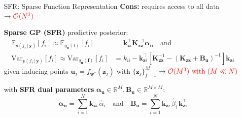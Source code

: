 \documentclass[final,12pt]{beamer}
\newcommand{\mathbold}[1]{\bm{#1}}
\newcommand{\mbf}[1]{\mathbf{#1}}
\renewcommand{\mid}{\,|\,}
\newcommand{\T}{\top}
\newcommand{\valpha}[0]{\mathbold{\alpha}}
\newcommand{\MBeta}[0]{\mathbold{B}}
\newcommand{\vz}{\mbf{z}}
\newcommand{\vf}{\mbf{f}}
\newcommand{\vu}{\mbf{u}}
\newcommand{\vy}{\mbf{y}}
\newcommand{\vw}{\mbf{w}}
\newcommand{\MKzz}{\mbf{K}_{\mbf{z}\mbf{z}}}
\newcommand{\vkzi}{\mbf{k}_{\mbf{z}i}}
\newcommand{\vkzs}{\mbf{k}_{\mbf{z}i}}
\newcommand{\R}{\mathbb{R}}
\newcommand{\myexpect}{\mathbb{E}}
\newlength{\sepwidth}
\newlength{\colwidth}
\newcommand{\separatorcolumn}{\begin{column}{\sepwidth}\end{column}}
\renewcommand{\mid}[0]{\,|\,}
\begin{document}
\begin{frame}[t]
\begin{columns}[t]
\begin{column}{\colwidth}
\begin{block}{SFR: Sparse Function Representation}
{\bf Cons:} requires access to all data $\rightarrow \color{red}{\mathcal{O}(N^3)}$

\alert{\bf Sparse GP (SFR)} predictive posterior:
\begin{align}   
\myexpect_{p(f_i \mid\vy)}[f_i] \approx \myexpect_{q_{\vu}(\vf)}[f_i] &= \vkzs^{\T} \MKzz^{-1} \valpha_{\vu}
   \quad \text{and} \\ 
\mathrm{Var}_{p(f_i \mid \vy)}[f_i] \approx \textrm{Var}_{q_{\vu}(\vf)}[f_i] &= k_{ii} - \vkzs^\top [\MKzz^{-1} - (\MKzz + \MBeta_{\vu})^{-1} ]\vkzs
\end{align}
given inducing points $\vu_j=f_{\vw^*}(\vz_j)$ with   $\{\vz_j\}_{j=1}^M$ 
$\rightarrow \color{red}{\mathcal{O}(M^3) \text{ with } (M\ll N)}$

with \alert{\bf SFR dual parameters} $\valpha_{\vu} \in \R^M, \MBeta_{\vu} \in \R^{M \times M}$: 
\begin{equation}
\valpha_{\vu}  =  \sum_{i=1}^N  \vkzi \, \hat{\alpha}_{i} %
\quad \text{and} \quad
  \MBeta_{\vu} =  \sum_{i=1}^N \vkzi \,\hat{\beta}_{i} \, \vkzi^{\T} %
\end{equation}

\end{block}
\end{column}
\separatorcolumn
\end{columns}
\vspace{-1.6cm}


\end{frame}
\end{document}
